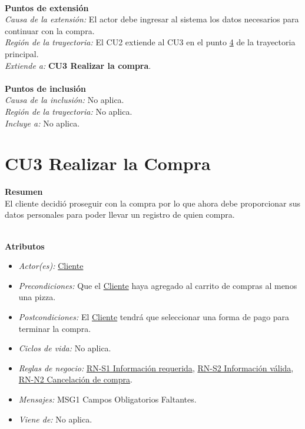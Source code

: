 \noindent \textbf{\\Puntos de extensión}\\

\noindent \textit{Causa de la extensión:} El actor debe ingresar al sistema los datos necesarios para continuar con la compra.\\
\textit{Región de la trayectoria:} El CU2 extiende al CU3 en el punto \hyperlink{CU2:TP:P4}{4} de la trayectoria principal. \\
\textit{Extiende a:} \textbf{CU3 Realizar la compra}.\\


\noindent \textbf{\\Puntos de inclusión}\\

\noindent \textit{Causa de la inclusión:} No aplica.\\
\textit{Región de la trayectoria:} No aplica.\\
\textit{Incluye a:} No aplica.\\

\hypertarget{CU3}{}
\section{CU3 Realizar la Compra}

\noindent \textbf{Resumen}\\

El cliente decidió proseguir con la compra por lo que ahora debe proporcionar sus datos personales para poder llevar un registro de quien compra.

\noindent \textbf{\\Atributos}

\begin{itemize}
	
	\item \textit{Actor(es):} \hyperlink{A:Cliente}{Cliente}
	\item \textit{Precondiciones:} Que el \hyperlink{A:Cliente}{Cliente} haya agregado al carrito de compras al menos una pizza.
	\item \textit{Postcondiciones:} El \hyperlink{A:Cliente}{Cliente} tendrá que seleccionar una forma de pago para terminar la compra.
	\item \textit{Ciclos de vida:} No aplica.
	\item \textit{Reglas de negocio:} \hyperlink{RN:S1:InfoRequerida}{RN-S1 Información requerida}, \hyperlink{RN:S2:InfoValida}{RN-S2 Información válida}, \hyperlink{RN:N2:Cancelacion}{RN-N2 Cancelación de compra}.
	\item \textit{Mensajes:} MSG1 Campos Obligatorios Faltantes.
	\item \textit{Viene de:} No aplica.
	
\end{itemize} 

